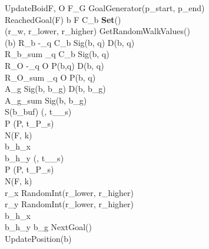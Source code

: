\documentclass[12pt]{article}
\begin{document}
\newpage
\begin{pseudocode}{UpdateBoid}{F, O}
F_G \GETS GoalGenerator(p_{start}, p_{end}) \\
\WHILE \neg ReachedGoal(F)
\DO
\BEGIN
\FOREACH b \in F \DO
\BEGIN
C_b \GETS \textbf{Set}() \\
(r_w, r_{lower}, r_{higher}) \GETS GetRandomWalkValues() \\
\IF \neg {}(b)
\THEN
\BEGIN
R_b \GETS -\sum_{q \in C_b} Sig(b, q) \cdot D(b, q) \\
R_{b_{sum}} \GETS \sum_{q \in C_b} Sig(b, q) \\ 
R_O \GETS -\sum_{q \in O} P(b,q) \cdot D(b, q) \\ 
R_{O_{sum}} \GETS \sum_{q \in O} P(b, q) \\
A_g \GETS Sig(b, b_g) \cdot D(b, b_g) \\
A_{g_{sum}} \GETS Sig(b, b_g) \\
\IF \neg S(b_{buf})
\THEN
\BEGIN
\gamma \GETS \tau(\gamma, t_{\gamma_{\neg s}}) \\
P \GETS \tau(P, t_{P_{\neg s}}) \\
\eta \GETS N(F, k) \\
b_{h_x} \GETS {}\\
b_{h_y} \GETS {} 
\END
\ELSE
\BEGIN
\gamma \GETS \tau(\gamma, t_{\gamma_s}) \\
P \GETS \tau(P, t_{P_s}) \\
\eta \GETS N(F, k) \\
r_x \GETS RandomInt(r_{lower}, r_{higher}) \\
r_y \GETS RandomInt(r_{lower}, r_{higher}) \\
b_{h_x} \GETS {} \\
b_{h_y} \GETS {}
\END
\END
\ELSE
b_g \GETS NextGoal() \\
UpdatePosition(b)
\END
\END
\end{pseudocode}
\end{document}
